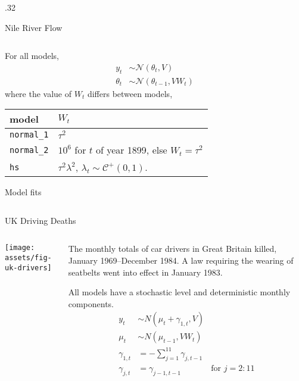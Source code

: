 \documentclass[final]{beamer}
\newcommand{\dist}[1]{\mathcal{#1}}
\newcommand{\paren}[1]{\ensuremath{\left(#1\right)}}
\newcommand{\dnorm}[1]{\ensuremath{\dist{N}\paren{#1}}}
\newcommand{\dhalfcauchy}[1]{\ensuremath{\dist{C}^{+}\paren{#1}}}
\def \ColTwo {.32\textwidth}
\begin{document}
\begin{frame}[fragile]
\begin{columns}[t]
\begin{column}{\ColTwo}
\begin{block}{Nile River Flow}
\begin{columns}
\begin{column}{0.5\textwidth}
            \vspace{1ex}
            For all models,
            \begin{align*}
              y_{t} &\sim \dnorm{\theta_{t}, V} \\
              \theta_{t} & \sim \dnorm{\theta_{t-1}, V W_{t}}
            \end{align*}
            where the value of $W_{t}$ differs between models,
            \vspace{1ex}
            \begin{center}
            \begin{tabular}{p{2.5in}p{4.5in}}
              model & $W_t$ \\
              \hline{}%
              \texttt{normal\_1} & $\tau^{2}$ \\
              \texttt{normal\_2} & $10^{6}$ for $t$ of year 1899, else $W_{t} = \tau^{2}$ \\
              \texttt{hs} & $\tau^{2} \lambda^{2}$, $\lambda_{t} \sim \dhalfcauchy{0, 1}$.
            \end{tabular}

            \begin{block}{Model fits}
                            
            \end{block}

            \end{center}

          \end{column}
        \end{columns}

      \end{block}

      \begin{block}{UK Driving Deaths}
        \begin{columns}
          \begin{column}{0.5\textwidth}
            \texttt{[image: assets/fig-uk-drivers]}
          \end{column}
          \begin{column}{0.5\textwidth}

            The monthly totals of car drivers in Great Britain killed, January 1969--December 1984. A law requiring the wearing of seatbelts went into effect in January 1983.

            \vspace{1ex}
            All models have a stochastic level and deterministic monthly components.
            \begin{align*}
              y_{t} &\sim N(\mu_{t} + \gamma_{1,t}, V) \\
              \mu_{t} &\sim N(\mu_{t-1}, V W_{t}) \\
              \gamma_{1,t} & = - \sum_{j = 1}^{11} \gamma_{j, t - 1} \\
              \gamma_{j,t} & =  \gamma_{j - 1, t - 1} & \text{for $j = 2:11$}
            \end{align*}


\end{column}
\end{columns}
\end{block}
\end{column}
\end{columns}
\end{frame}
\end{document}
